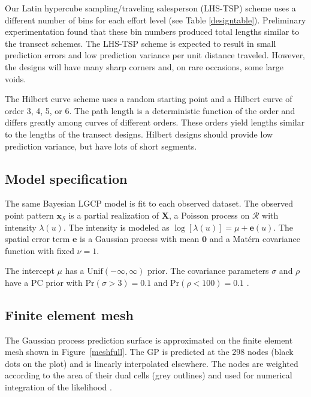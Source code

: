 \documentclass[review]{elsarticle}
\begin{document}
Our Latin hypercube sampling/traveling salesperson (LHS-TSP) scheme uses a
different number of bins for each effort level (see Table \ref{designtable}).
Preliminary experimentation found that these bin numbers produced total lengths
similar to the transect schemes. The LHS-TSP scheme is expected to result
in small prediction errors and low prediction variance per unit distance
traveled. However, the designs will have many sharp corners and, on rare
occasions, some large voids.

The Hilbert curve scheme uses a random starting point and a Hilbert curve of
order 3, 4, 5, or 6. The path length is a deterministic function of the order
and differs greatly among curves of different orders. These orders yield
lengths similar to the lengths of the transect designs. Hilbert designs should
provide low prediction variance, but have lots of short segments.


\subsection{Model specification}
\label{simmodel}

The same Bayesian LGCP model is fit to each observed dataset. The observed
point pattern \(\mathbf{x}_{\mathcal{S}}\) is a partial realization of
\(\mathbf{X}\), a Poisson process on \(\mathcal{R}\) with intensity
\(\lambda(u)\). The intensity is modeled as
\(\log[\lambda(u)] = \mu + \mathbf{e}(u)\). The spatial error term
\(\mathbf{e}\) is a Gaussian process with mean \(\mathbf{0}\) and a
Mat\'{e}rn covariance function with fixed \(\nu = 1\).

The intercept \(\mu\) has a \(\mathrm{Unif}(-\infty, \infty)\) prior.
The covariance parameters \(\sigma\) and \(\rho\) have a PC prior with
\(\mathrm{Pr}(\sigma > 3) = 0.1\) and \(\mathrm{Pr}(\rho < 100) = 0.1\)
\citep{fuglstadetal,simpsonpc}.


\subsection{Finite element mesh}
\label{simmesh}

The Gaussian process prediction surface is approximated on the finite element
mesh shown in Figure~\ref{meshfull}. The GP is predicted at the 298 nodes
(black dots on the plot) and is linearly interpolated elsewhere. The nodes are
weighted according to the area of their dual cells (grey outlines) and used
for numerical integration of the likelihood \citep{lindgrenetal}.
\end{document}
